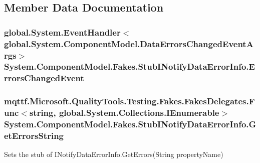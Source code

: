 \subsection{Member Data Documentation}
\hypertarget{class_system_1_1_component_model_1_1_fakes_1_1_stub_i_notify_data_error_info_afe9f3bc09b5b5b2de10c499c2f620ca0}{
\subsubsection[{Errors\-Changed\-Event}]{\setlength{\rightskip}{0pt plus 5cm}global.\-System.\-Event\-Handler$<$global.\-System.\-Component\-Model.\-Data\-Errors\-Changed\-Event\-Args$>$ System.\-Component\-Model.\-Fakes.\-Stub\-I\-Notify\-Data\-Error\-Info.\-Errors\-Changed\-Event}}\label{class_system_1_1_component_model_1_1_fakes_1_1_stub_i_notify_data_error_info_afe9f3bc09b5b5b2de10c499c2f620ca0}
\hypertarget{class_system_1_1_component_model_1_1_fakes_1_1_stub_i_notify_data_error_info_ad835e70cc42280723e7d65aa684b8db1}{
\subsubsection[{Get\-Errors\-String}]{\setlength{\rightskip}{0pt plus 5cm}mqttf.\-Microsoft.\-Quality\-Tools.\-Testing.\-Fakes.\-Fakes\-Delegates.\-Func$<$string, global.\-System.\-Collections.\-I\-Enumerable$>$ System.\-Component\-Model.\-Fakes.\-Stub\-I\-Notify\-Data\-Error\-Info.\-Get\-Errors\-String}}\label{class_system_1_1_component_model_1_1_fakes_1_1_stub_i_notify_data_error_info_ad835e70cc42280723e7d65aa684b8db1}


Sets the stub of I\-Notify\-Data\-Error\-Info.\-Get\-Errors(\-String property\-Name)

